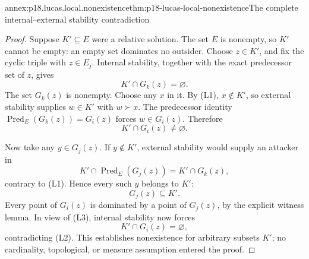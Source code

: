 \begin{annexitem}{annex:p18.lucas.local.nonexistence}{thm:p18-lucas-local-nonexistence}{The complete internal--external stability contradiction}
\begin{proof}
Suppose \(K'\subseteq E\) were a relative solution.
The set \(E\) is nonempty, so \(K'\) cannot be empty:
an empty set dominates no outsider. Choose \(z\in K'\),
and fix the cyclic triple with \(z\in E_j\).
Internal stability, together with the exact predecessor
set of \(z\), gives
\[
                              K'\cap G_k(z)=\varnothing. \tag{L1}
\]
The set \(G_k(z)\) is nonempty. Choose any \(x\) in it.
By (L1), \(x\notin K'\), so external stability supplies
\(w\in K'\) with \(w\succ x\).
The predecessor identity
\(\operatorname{Pred}_E(G_k(z))=G_i(z)\) forces \(w\in G_i(z)\).
Therefore
\[
                              K'\cap G_i(z)\ne\varnothing. \tag{L2}
\]

Now take any \(y\in G_j(z)\). If \(y\notin K'\), external
stability would supply an attacker in
\[
                 K'\cap\operatorname{Pred}_E(G_j(z))
                                      =K'\cap G_k(z),
\]
contrary to (L1). Hence every such \(y\) belongs to \(K'\):
\[
                                         G_j(z)\subseteq K'. \tag{L3}
\]
Every point of \(G_i(z)\) is dominated by a point of \(G_j(z)\),
by the explicit witness lemma. In view of (L3), internal
stability now forces
\[
                              K'\cap G_i(z)=\varnothing,
\]
contradicting (L2). This establishes nonexistence for
arbitrary subsets \(K'\); no cardinality, topological,
or measure assumption entered the proof.
\end{proof}
\end{annexitem}

